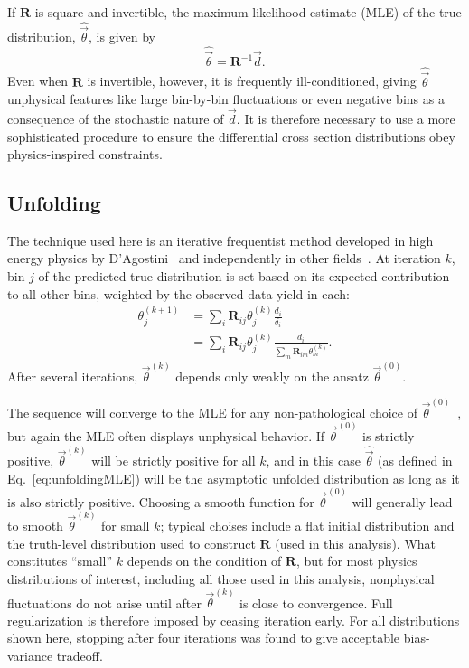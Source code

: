 If $\mathbf{R}$ is square and invertible, the maximum likelihood estimate (MLE) of the true distribution, $\hat{\vec{\theta}}$, is given by
\begin{equation}\label{eq:unfoldingMLE}
  \hat{\vec{\theta}} = \mathbf{R}^{-1}\vec{d}.
\end{equation}
Even when $\mathbf{R}$ is invertible, however, it is frequently ill-conditioned, giving $\hat\vec\theta$ unphysical features like large bin-by-bin fluctuations or even negative bins as a consequence of the stochastic nature of $\vec{d}$.
It is therefore necessary to use a more sophisticated procedure to ensure the differential cross section distributions obey physics-inspired constraints.

\subsection{Unfolding}

The technique used here is an iterative frequentist method developed in high energy physics by D'Agostini~\cite{DAgostini:1994fjx} and independently in other fields~\cite{Dempster:10.2307/2984875,Lucy:1974AJ,Richardson:72,Shepp:4307558}.
At iteration $k$, bin $j$ of the predicted true distribution is set based on its expected contribution to all other bins, weighted by the observed data yield in each:
\begin{equation}
  \begin{split}
    \theta_j^{(k+1)} & = \sum_i \mathbf{R}_{ij} \theta_j^{(k)} \frac{d_i}{\delta_i} \\
    & = \sum_i \mathbf{R}_{ij} \theta_j^{(k)} \frac{d_i}{\sum_m \mathbf{R}_{im} \theta_m^{(k)}}.
  \end{split}
\end{equation}
After several iterations, $\vec{\theta}^{(k)}$ depends only weakly on the ansatz $\vec{\theta}^{(0)}$.

The sequence will converge to the MLE for any non-pathological choice of $\vec{\theta}^{(0)}$~\cite{vardi1985}, but again the MLE often displays unphysical behavior.
If $\vec{\theta}^{(0)}$ is strictly positive, $\vec{\theta}^{(k)}$ will be strictly positive for all $k$, and in this case $\hat{\vec{\theta}}$ (as defined in Eq.~\ref{eq:unfoldingMLE}) will be the asymptotic unfolded distribution as long as it is also strictly positive.
Choosing a smooth function for $\vec{\theta}^{(0)}$ will generally lead to smooth $\vec{\theta}^{(k)}$ for small $k$; typical choises include a flat initial distribution and the truth-level distribution used to construct $\mathbf{R}$ (used in this analysis).
What constitutes ``small'' $k$ depends on the condition of $\mathbf{R}$, but for most physics distributions of interest, including all those used in this analysis, nonphysical fluctuations do not arise until after $\vec{\theta}^{(k)}$ is close to convergence.
Full regularization is therefore imposed by ceasing iteration early.
For all distributions shown here, stopping after four iterations was found to give acceptable bias-variance tradeoff.

